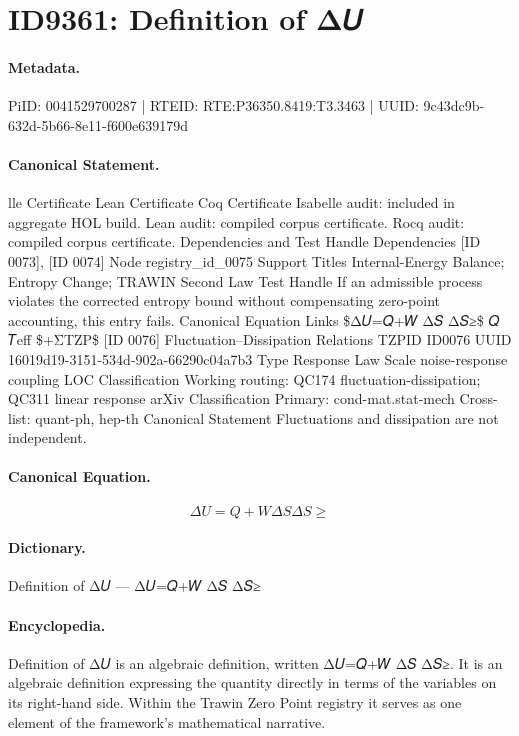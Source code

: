 \section*{ID9361: Definition of Δ𝑈}
\paragraph{Metadata.}
PiID: 0041529700287 | RTEID: RTE:P36350.8419:T3.3463 | UUID: 9c43dc9b-632d-5b66-8e11-f600e639179d

\paragraph{Canonical Statement.}
lle Certificate Lean Certificate Coq Certificate Isabelle audit: included in aggregate HOL build. Lean audit: compiled corpus certificate. Rocq audit: compiled corpus certificate. Dependencies and Test Handle Dependencies [ID 0073], [ID 0074] Node registry\_id\_0075 Support Titles Internal-Energy Balance; Entropy Change; TRAWIN Second Law Test Handle If an admissible process violates the corrected entropy bound without compensating zero-point accounting, this entry fails. Canonical Equation Links \$Δ𝑈=𝑄+𝑊 Δ𝑆 Δ𝑆≥\$ 𝑄 𝑇eff \$+ΣTZP\$ [ID 0076] Fluctuation–Dissipation Relations TZPID ID0076 UUID 16019d19-3151-534d-902a-66290c04a7b3 Type Response Law Scale noise-response coupling LOC Classification Working routing: QC174 fluctuation-dissipation; QC311 linear response arXiv Classification Primary: cond-mat.stat-mech Cross-list: quant-ph, hep-th Canonical Statement Fluctuations and dissipation are not independent.

\paragraph{Canonical Equation.}
\[
Δ𝑈=𝑄+𝑊 Δ𝑆 Δ𝑆≥
\]

\paragraph{Dictionary.}
Definition of Δ𝑈 — Δ𝑈=𝑄+𝑊 Δ𝑆 Δ𝑆≥

\paragraph{Encyclopedia.}
Definition of Δ𝑈 is an algebraic definition, written Δ𝑈=𝑄+𝑊 Δ𝑆 Δ𝑆≥. It is an algebraic definition expressing the quantity directly in terms of the variables on its right-hand side. Within the Trawin Zero Point registry it serves as one element of the framework's mathematical narrative.
